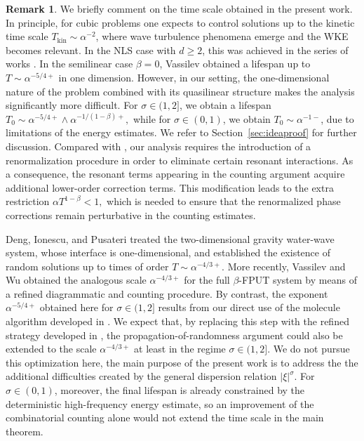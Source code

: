 \documentclass[UTF-8,reqno]{amsart}
\numberwithin{equation}{section}
\theoremstyle{definition}
\newtheorem{remark}[theorem]{Remark}
\def\geq{\geqslant}
\def\br{\begin{remark}}
\def\er{\end{remark}}
\def\geq{\geqslant}
\begin{document}
\br We briefly comment on the time scale obtained in the present work. 
In principle, for cubic problems one expects to control solutions up to the kinetic time scale 
$T_{\mathrm{kin}} \sim \alpha^{-2}$, where wave turbulence phenomena emerge and the WKE becomes relevant. 
In the NLS case with $d \geq 2$, this was achieved in the series of works \cite{DH23a,DH23b,DH23c}. 
In the semilinear case $\beta = 0$, Vassilev \cite{Vas24} obtained a lifespan up to 
$T \sim \alpha^{-5/4+}$ in one dimension. 
However, in our setting, the one-dimensional nature of the problem combined with its quasilinear structure 
makes the analysis significantly more difficult. 
For $\sigma \in (1,2]$, we obtain a lifespan $T _0\sim \alpha^{-5/4+} \wedge \alpha^{-1/(1-\beta)+},$
while for $\sigma \in (0,1)$, we obtain $T_0 \sim \alpha^{-1-}$,
due to limitations of the energy estimates. 
We refer to Section~\ref{sec:ideaproof} for further discussion. Compared with \cite{Vas24}, our analysis requires the introduction of a renormalization procedure in order to eliminate certain resonant interactions. 
As a consequence, the resonant terms appearing in the counting argument acquire additional lower-order correction terms. 
This modification leads to the extra restriction $\alpha T^{1-\beta}<1,$ which is needed to ensure that the renormalized phase corrections remain perturbative in the counting estimates.  

Deng, Ionescu, and Pusateri \cite{DIP25} treated the two-dimensional gravity water-wave system, whose interface is one-dimensional, and established the existence of random solutions up to times of order $T \sim\alpha^{-4/3+}$. More recently, Vassilev and Wu \cite{VW26} obtained the analogous scale $ \alpha^{-4/3+}$ for the full $\beta$-FPUT system by means of a refined diagrammatic and counting procedure.
By contrast, the exponent $\alpha^{-5/4+}$ obtained here for $\sigma\in(1,2]$ results from our direct use of the molecule algorithm developed in \cite{Vas24}. We expect that, by replacing this step with the refined strategy developed in \cite{DIP25,VW26}, the propagation-of-randomness argument could also be extended to the scale $\alpha^{-4/3+}$ at least in the regime $\sigma\in(1,2]$. We do not pursue this optimization here, the main purpose of the present work is to address the the additional difficulties created by the general dispersion relation $|\xi|^\sigma$.  For $\sigma\in(0,1)$, moreover, the final lifespan is already constrained by the deterministic high-frequency energy estimate, so an improvement of the combinatorial counting alone would not extend the time scale in the main theorem.
\er
  
\end{document}
